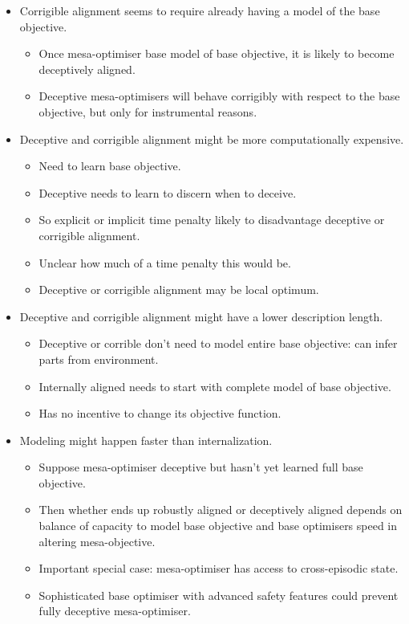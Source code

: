 \begin{itemize}
    \item Corrigible alignment seems to require already having a model of the base objective.
    \begin{itemize}
        \item Once mesa-optimiser base model of base objective, it is likely to become deceptively aligned.
        \item Deceptive mesa-optimisers will behave corrigibly with respect to the base objective, but only for instrumental reasons.
    \end{itemize}
    \item Deceptive and corrigible alignment might be more computationally expensive.
    \begin{itemize}
        \item Need to learn base objective.
        \item Deceptive needs to learn to discern when to deceive.
        \item So explicit or implicit time penalty likely to disadvantage deceptive or corrigible alignment. 
        \item Unclear how much of a time penalty this would be.
        \item Deceptive or corrigible alignment may be local optimum.
    \end{itemize}
    \item Deceptive and corrigible alignment might have a lower description length.
    \begin{itemize}
        \item Deceptive or corrible don't need to model entire base objective: can infer parts from environment.
        \item Internally aligned needs to start with complete model of base objective.
        \item Has no incentive to change its objective function.
    \end{itemize}
    \item Modeling might happen faster than internalization.
    \begin{itemize}
        \item Suppose mesa-optimiser deceptive but hasn't yet learned full base objective.
        \item Then whether ends up robustly aligned or deceptively aligned depends on balance of capacity to model base objective and base optimisers speed in altering mesa-objective.
        \item Important special case: mesa-optimiser has access to cross-episodic state.
        \item Sophisticated base optimiser with advanced safety features could prevent fully deceptive mesa-optimiser.
    \end{itemize}
\end{itemize}


